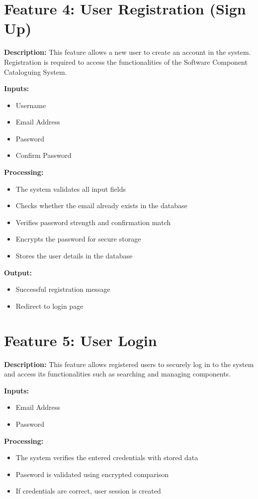 \documentclass[12pt]{scrreprt}
\begin{document}
\section{Feature 4: User Registration (Sign Up)}

\textbf{Description:} This feature allows a new user to create an account in the system. Registration is required to access the functionalities of the Software Component Cataloguing System.

\textbf{Inputs:}
\begin{itemize}
    \item Username
    \item Email Address
    \item Password
    \item Confirm Password
\end{itemize}

\textbf{Processing:}
\begin{itemize}
    \item The system validates all input fields
    \item Checks whether the email already exists in the database
    \item Verifies password strength and confirmation match
    \item Encrypts the password for secure storage
    \item Stores the user details in the database
\end{itemize}

\textbf{Output:}
\begin{itemize}
    \item Successful registration message
    \item Redirect to login page
\end{itemize}

\section{Feature 5: User Login}

\textbf{Description:} This feature allows registered users to securely log in to the system and access its functionalities such as searching and managing components.

\textbf{Inputs:}
\begin{itemize}
    \item Email Address
    \item Password
\end{itemize}

\textbf{Processing:}
\begin{itemize}
    \item The system verifies the entered credentials with stored data
    \item Password is validated using encrypted comparison
    \item If credentials are correct, user session is created
\end{itemize}
\end{document}

